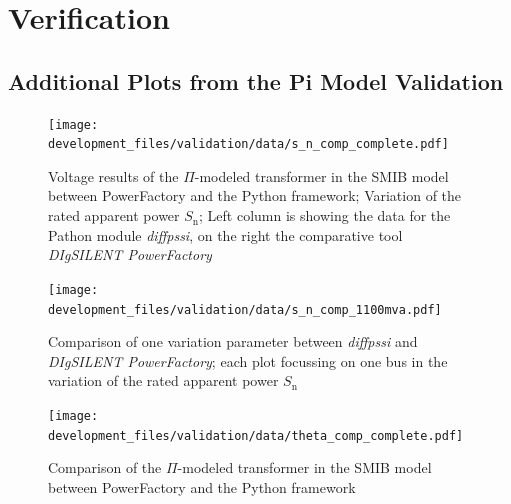 

\chapter{Verification}


\section{Additional Plots from the  Pi Model Validation}
\label{app:add-validation-plots}

\begin{figure}[H]
    \centering
    \texttt{[image: development\_files/validation/data/s\_n\_comp\_complete.pdf]}
    \caption[Model results concerning the variation of the rated apparent power]{Voltage results of the $\Pi$-modeled transformer in the \acs{SMIB} model between PowerFactory and the Python framework; Variation of the rated apparent power $S_\mathrm{n}$; Left column is showing the data for the Pathon module \textit{diffpssi}, on the right the comparative tool \textit{DIgSILENT PowerFactory}}
    \label{fig:valid-s-compl}
\end{figure}

\begin{figure}[H]
    \centering
    \texttt{[image: development\_files/validation/data/s\_n\_comp\_1100mva.pdf]}
    \caption{Comparison of one variation parameter between \textit{diffpssi} and \textit{DIgSILENT PowerFactory}; each plot focussing on one bus in the variation of the rated apparent power $S_\mathrm{n}$}
    \label{fig:valid-s-1100}
\end{figure}

\begin{figure}[H]
    \centering
    \texttt{[image: development\_files/validation/data/theta\_comp\_complete.pdf]}
    \caption{Comparison of the $\Pi$-modeled transformer in the \acs{SMIB} model between PowerFactory and the Python framework}
    \label{fig:valid-ratio-comp}
\end{figure}

